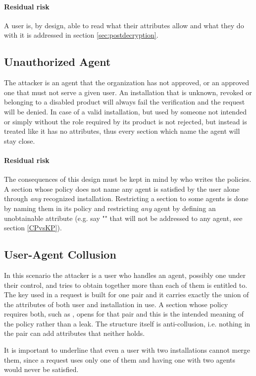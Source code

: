 \paragraph{Residual risk} A user is, by design, able to read what their attributes allow and what they do with it is addressed in section \ref{sec:postdecryption}.

\subsection{Unauthorized Agent}
The attacker is an agent that the organization has not approved, or an approved one that must not serve a given user.
An installation that is unknown, revoked or belonging to a disabled product will always fail the verification and the request will be denied.
In case of a valid installation, but used by someone not intended or simply without the role required by its product is not rejected, but instead is treated like it has no attributes, thus every section which name the agent will stay close.

\paragraph{Residual risk} The consequences of this design must be kept in mind by who writes the policies.
A section whose policy does not name any agent is satisfied by the user alone through \textit{any} recognized installation.
Restricting a section to some agents is done by naming them in its policy and restricting \textit{any} agent by defining an unobtainable attribute (e.g. say "" that will not be addressed to any agent, see section \ref{CPvsKP}).

\subsection{User-Agent Collusion}
In this scenario the attacker is a user who handles an agent, possibly one under their control, and tries to obtain together more than each of them is entitled to.
The key used in a request is built for one pair and it carries exactly the union of the attributes of both user and installation in use. A section whose policy requires both, such as , opens for that pair and this is the intended meaning of the policy rather than a leak.
The structure itself is anti-collusion, i.e. nothing in the pair can add attributes that neither holds.

It is important to underline that even a user with two installations cannot merge them, since a request uses only one of them and having one with two agents would never be satisfied.

